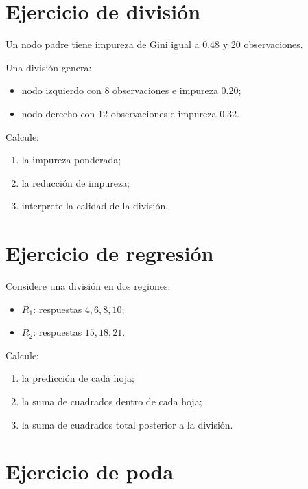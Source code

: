 \documentclass[
  spanish,
  11pt,
  letterpaper,
  DIV=11,
  numbers=noendperiod]{scrreprt}
\providecommand{\tightlist}{%
  \setlength{\itemsep}{0pt}\setlength{\parskip}{0pt}}
\theoremstyle{definition}
\theoremstyle{plain}
\theoremstyle{definition}
\theoremstyle{remark}
\begin{document}
\section{Ejercicio de división}\label{ejercicio-de-divisiuxf3n}

Un nodo padre tiene impureza de Gini igual a 0.48 y 20 observaciones.

Una división genera:

\begin{itemize}
\tightlist
\item
  nodo izquierdo con 8 observaciones e impureza 0.20;
\item
  nodo derecho con 12 observaciones e impureza 0.32.
\end{itemize}

Calcule:

\begin{enumerate}
\def\labelenumi{\arabic{enumi}.}
\tightlist
\item
  la impureza ponderada;
\item
  la reducción de impureza;
\item
  interprete la calidad de la división.
\end{enumerate}

\section{Ejercicio de regresión}\label{ejercicio-de-regresiuxf3n-1}

Considere una división en dos regiones:

\begin{itemize}
\tightlist
\item
  \(R_1\): respuestas \(4,6,8,10\);
\item
  \(R_2\): respuestas \(15,18,21\).
\end{itemize}

Calcule:

\begin{enumerate}
\def\labelenumi{\arabic{enumi}.}
\tightlist
\item
  la predicción de cada hoja;
\item
  la suma de cuadrados dentro de cada hoja;
\item
  la suma de cuadrados total posterior a la división.
\end{enumerate}

\section{Ejercicio de poda}\label{ejercicio-de-poda}
\end{document}
